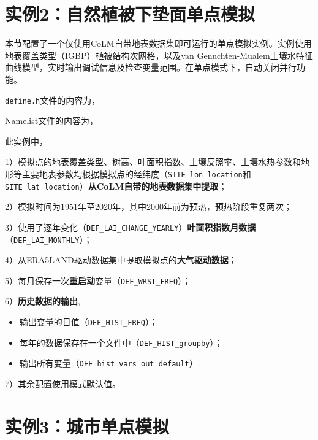 \section{实例2：自然植被下垫面单点模拟}

本节配置了一个仅使用CoLM自带地表数据集即可运行的单点模拟实例。实例使用地表覆盖类型（IGBP）植被结构次网格，以及van Genuchten-Mualem土壤水特征曲线模型，实时输出调试信息及检查变量范围。在单点模式下，自动关闭并行功能。

\texttt{define.h}文件的内容为，


Namelist文件的内容为，


此实例中，\par
1）模拟点的地表覆盖类型、树高、叶面积指数、土壤反照率、土壤水热参数和地形等主要地表参数均根据模拟点的经纬度（\texttt{SITE\_lon\_location}和\texttt{SITE\_lat\_location}）\textbf{从CoLM自带的地表数据集中提取}；\par
2）模拟时间为1951年至2020年，其中2000年前为预热，预热阶段重复两次；\par
3）使用了逐年变化（\texttt{DEF\_LAI\_CHANGE\_YEARLY}）\textbf{叶面积指数月数据}\\ （\texttt{DEF\_LAI\_MONTHLY}）；\par
4）从ERA5LAND驱动数据集中提取模拟点的\textbf{大气驱动数据}；\par
5）每月保存一次\textbf{重启动}变量（\texttt{DEF\_WRST\_FREQ}）；\par
6）\textbf{历史数据的输出},
\begin{itemize}[nosep,leftmargin=4em]
    \item 输出变量的日值（\texttt{DEF\_HIST\_FREQ}）；
    \item 每年的数据保存在一个文件中（\texttt{DEF\_HIST\_groupby}）；
    \item 输出所有变量（\texttt{DEF\_hist\_vars\_out\_default}）.
\end{itemize} \par
7）其余配置使用模式默认值。

\section{实例3：城市单点模拟}

